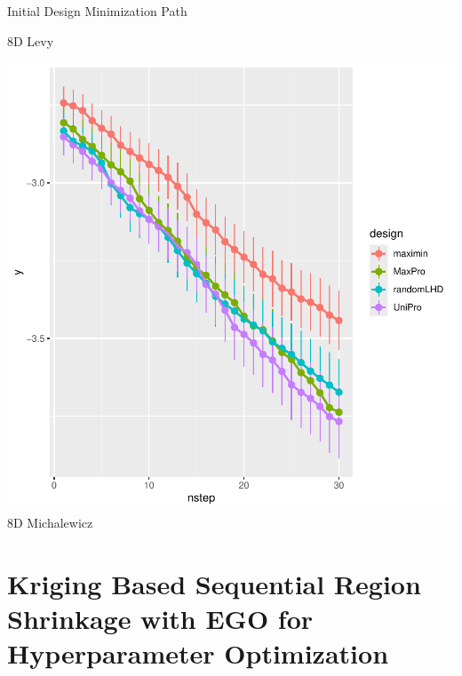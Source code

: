 \documentclass{beamer}
\begin{document}
\begin{frame}{Initial Design Minimization Path}
\begin{minipage}{0.32\textwidth}
\small {8D Levy}
\end{minipage}
\hfill
\begin{minipage}{0.32\textwidth}
\centering
\includegraphics[width=\textwidth]{../chapters/EGO/pdfs/michal8_lineplot1}
\small {8D Michalewicz}
\end{minipage}
\end{frame}




\section{Kriging Based Sequential Region Shrinkage with EGO for  Hyperparameter Optimization}

\end{document}

